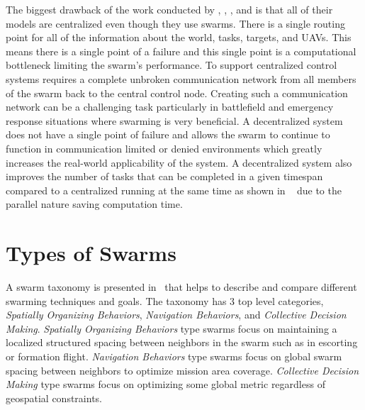 The biggest drawback of the work conducted by \textcite{jin}, \textcite{bellingham}, \textcite{beard}, and \textcite{wheeler} is that all of their models are centralized even though they use swarms.  There is a single routing point for all of the information about the world, tasks, targets, and UAVs.  This means there is a single point of a failure and this single point is a computational bottleneck limiting the swarm's performance.  To support centralized control systems requires a complete unbroken communication network from all members of the swarm back to the central control node.  Creating such a communication network can be a challenging task particularly in battlefield and emergency response situations where swarming is very beneficial.  A decentralized system does not have a single point of failure and allows the swarm to continue to function in communication limited or denied environments which greatly increases the real-world applicability of the system.  A decentralized system also improves the number of tasks that can be completed in a given timespan compared to a centralized running at the same time as shown in ~\textcite{chien} due to the parallel nature saving computation time.  

\section{Types of Swarms}
\label{sec:types_swarms}
A swarm taxonomy is presented in~\textcite{iridia} that helps to describe and compare different swarming techniques and goals. The taxonomy has 3 top level categories, \textit{Spatially Organizing Behaviors}, \textit{Navigation Behaviors}, and \textit{Collective Decision Making}.  \textit{Spatially Organizing Behaviors} type swarms focus on maintaining a localized structured spacing between neighbors in the swarm such as in escorting or formation flight.  \textit{Navigation Behaviors} type swarms focus on global swarm spacing between neighbors to optimize mission area coverage.  \textit{Collective Decision Making} type swarms focus on optimizing some global metric regardless of geospatial constraints.

